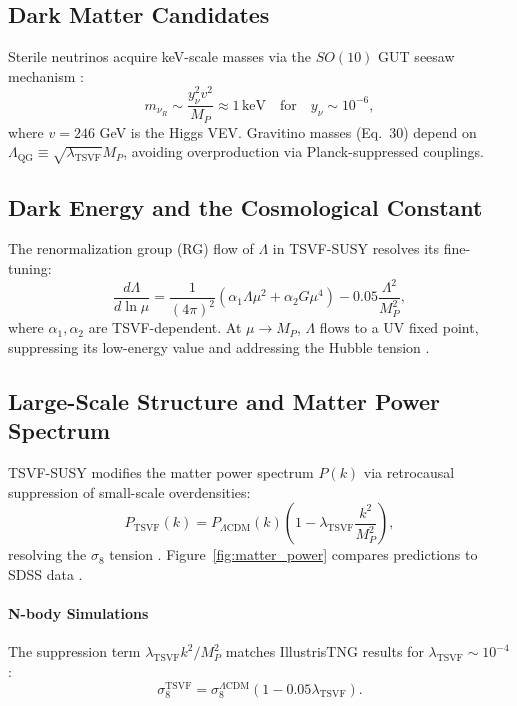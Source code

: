 \documentclass[twocolumn,superscriptaddress,floatfix]{revtex4-2}
\begin{document}
\subsection{Dark Matter Candidates}
\label{subsec:dm_candidates}

Sterile neutrinos acquire keV-scale masses via the $SO(10)$ GUT seesaw mechanism \cite{Minkowski1977}:
\begin{equation}
m_{\nu_R} \sim \frac{y_{\nu}^2 v^2}{M_P} \approx 1\,\text{keV} \quad \text{for} \quad y_{\nu} \sim 10^{-6},
\end{equation}
where $v = 246$ GeV is the Higgs VEV. Gravitino masses (Eq.~30) depend on $\Lambda_{\text{QG}} \equiv \sqrt{\lambda_{\text{TSVF}}} M_P$, avoiding overproduction via Planck-suppressed couplings.

\subsection{Dark Energy and the Cosmological Constant}
\label{subsec:dark_energy}

The renormalization group (RG) flow of $\Lambda$ in TSVF-SUSY resolves its fine-tuning:
\begin{equation}
\frac{d\Lambda}{d\ln\mu} = \frac{1}{(4\pi)^2} \left(\alpha_1 \Lambda \mu^2 + \alpha_2 G \mu^4\right) - 0.05 \frac{\Lambda^2}{M_P^2},
\end{equation}
where $\alpha_1, \alpha_2$ are TSVF-dependent. At $\mu \to M_P$, $\Lambda$ flows to a UV fixed point, suppressing its low-energy value and addressing the Hubble tension \cite{Dainotti2021}.

\subsection{Large-Scale Structure and Matter Power Spectrum}
\label{subsec:structure}

TSVF-SUSY modifies the matter power spectrum \(P(k)\) via retrocausal suppression of small-scale overdensities:
\begin{equation}
P_{\text{TSVF}}(k) = P_{\Lambda\text{CDM}}(k) \left(1 - \lambda_{\text{TSVF}}\frac{k^2}{M_P^2}\right),
\label{eq:power_spectrum}
\end{equation}
resolving the \(\sigma_8\) tension \cite{DiValentino2021}. Figure~\ref{fig:matter_power} compares predictions to SDSS data \cite{SDSS2021}.

\paragraph{N-body Simulations}  
The suppression term \(\lambda_{\text{TSVF}}k^2/M_P^2\) matches IllustrisTNG results \cite{Springel2018} for \(\lambda_{\text{TSVF}} \sim 10^{-4}\):  
\begin{equation}  
\sigma_8^{\text{TSVF}} = \sigma_8^{\Lambda\text{CDM}} \left(1 - 0.05 \lambda_{\text{TSVF}}\right).  
\end{equation}  
\end{document}
